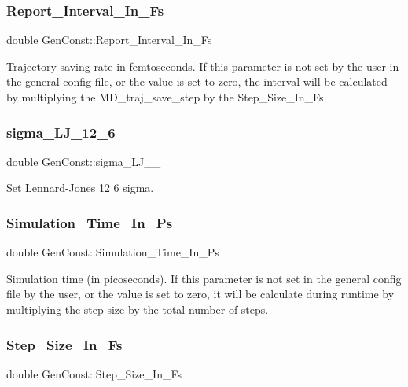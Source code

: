 \subsubsection{\texorpdfstring{Report\_Interval\_In\_Fs}{Report\_Interval\_In\_Fs}}
{\footnotesize\ttfamily double Gen\+Const\+::\+Report\+\_\+\+Interval\+\_\+\+In\+\_\+\+Fs}

Trajectory saving rate in femtoseconds. If this parameter is not set by the user in the general config file, or the value is set to zero, the interval will be calculated by multiplying the M\+D\+\_\+traj\+\_\+save\+\_\+step by the Step\+\_\+\+Size\+\_\+\+In\+\_\+\+Fs. \mbox{\label{namespaceGenConst_a34375d0ec9af3672f5fcbe624044ad8d}} 
\subsubsection{\texorpdfstring{sigma\_LJ\_12\_6}{sigma\_LJ\_12\_6}}
{\footnotesize\ttfamily double Gen\+Const\+::sigma\+\_\+\+L\+J\+\_\+\_}

Set Lennard-\/\+Jones 12 6 sigma. \mbox{\label{namespaceGenConst_a42400cc3781a5ee575ddafe4dcc2403f}} 
\subsubsection{\texorpdfstring{Simulation\_Time\_In\_Ps}{Simulation\_Time\_In\_Ps}}
{\footnotesize\ttfamily double Gen\+Const\+::\+Simulation\+\_\+\+Time\+\_\+\+In\+\_\+\+Ps}

Simulation time (in picoseconds). If this parameter is not set in the general config file by the user, or the value is set to zero, it will be calculate during runtime by multiplying the \textquotesingle{}step size\textquotesingle{} by the \textquotesingle{}total number of steps\textquotesingle{}. \mbox{\label{namespaceGenConst_a555432eb109df9dc1cf430bd6eccef30}} 
\subsubsection{\texorpdfstring{Step\_Size\_In\_Fs}{Step\_Size\_In\_Fs}}
{\footnotesize\ttfamily double Gen\+Const\+::\+Step\+\_\+\+Size\+\_\+\+In\+\_\+\+Fs}

